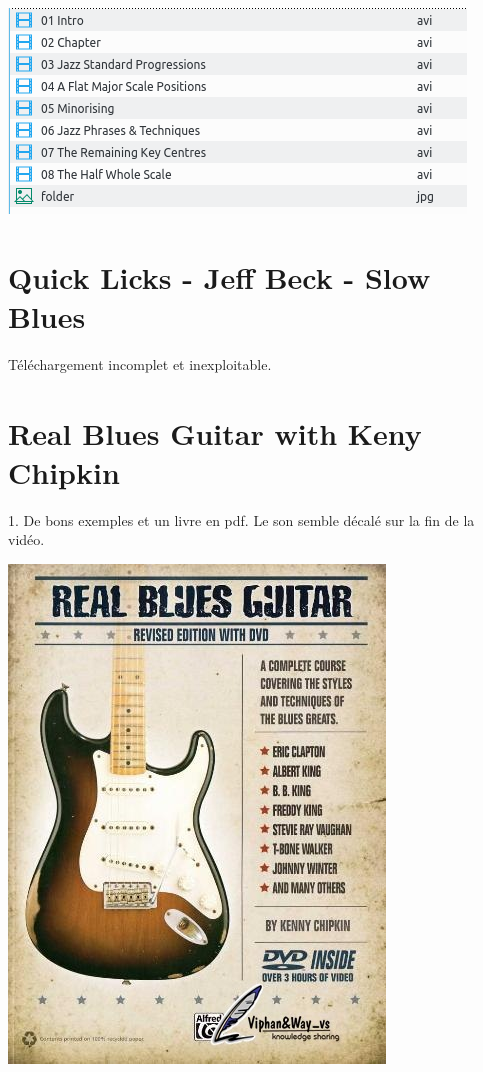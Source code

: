 \documentclass[a4paper]{book}
\begin{document}
\begin{center}
\includegraphics[width=12.143cm,height=5.449cm]{lebluessupportsmethodes-img135.png}
\end{center}





\clearpage\section[Quick Licks {}- Jeff Beck {}- Slow Blues]{Quick
Licks - Jeff Beck - Slow Blues}
\hypertarget{RefHeadingToc186973218262}{}T\'el\'echargement incomplet et
inexploitable.


\clearpage\section[Real Blues Guitar with Keny Chipkin]{Real Blues
Guitar with Keny Chipkin}
\hypertarget{RefHeadingToc188973218262}{}1. De bons exemples et un livre
en pdf. Le son semble d\'ecal\'e sur la fin de la vid\'eo.






\begin{center}
\includegraphics[width=10.001cm,height=13.229cm]{lebluessupportsmethodes-img136.jpg}
\end{center}
\end{document}
